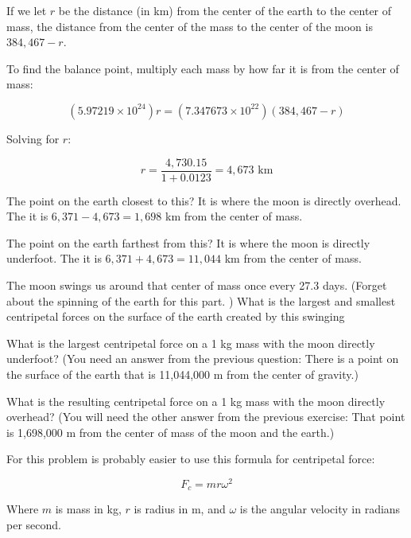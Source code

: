 \begin{Answer}[ref=life-orbits4]

If we let $r$ be the distance (in km) from the center of the earth to the center of mass,  the distance from
the center of the mass to the center of the moon is $384,467 - r$.

To find the balance point,  multiply each mass by how far it is from the center of mass:

$$\left( 5.97219 \times 10^{24} \right) r = \left( 7.347673 \times 10^{22} \right) \left(384,467 - r\right)$$

Solving for $r$:

$$ r = \frac{4,730.15}{1 + 0.0123} = 4,673 \text{ km} $$

The point on the earth closest to this?  It is where the moon is directly overhead.  The it is $6,371 - 4,673 = 1,698$ km from the center of mass.

The point on the earth farthest from this?  It is where the moon is directly underfoot.  The it is $6,371 + 4,673 = 11,044$ km from the center of mass.

\end{Answer}

\begin{Exercise}[title={Life Among the Orbits 5: Lunar Centripetal Force}, label=life-orbits5]

The moon swings us around that center of mass once every 27.3 days.  (Forget about the spinning of the earth for this part. )  What is the largest and smallest centripetal forces on the surface of the earth created by this swinging

What is the largest centripetal force on a 1 kg mass with the moon directly underfoot? (You need an answer from the previous question: There is a point on the surface of the earth that is 11,044,000 m from the center of gravity.)

What is the resulting centripetal force
on a 1 kg mass with the moon directly overhead?  (You will need the other answer from the previous exercise: That point is 1,698,000 m from the center of mass of the moon and the earth.)

For this problem is probably easier to use this formula for centripetal force:

$$F_c = m r \omega^2$$

Where $m$ is mass in kg,  $r$ is radius in m,  and $\omega$ is the angular velocity in radians per second.

\end{Exercise}

